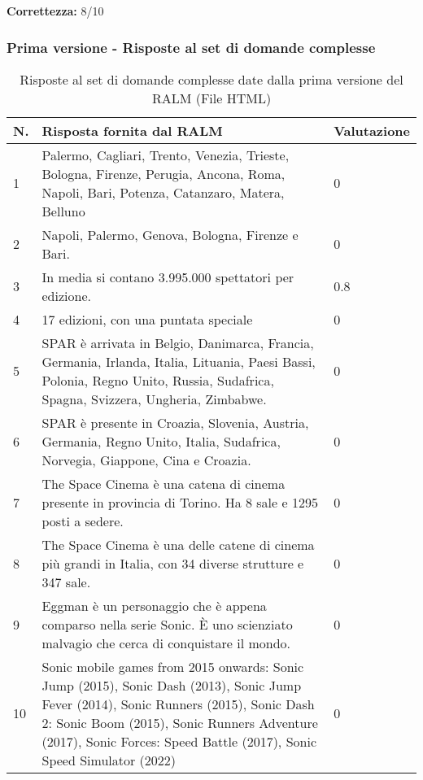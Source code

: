 \textbf{Correttezza:} 8/10

\subsubsection{Prima versione - Risposte al set di domande complesse}

\begin{table}[H]
    \centering
    \begin{tabular}{|p{0.5cm} |p{6cm} |p{2cm}|}
        \hline
        \textbf{N}. & \textbf{Risposta fornita dal RALM} & \textbf{Valutazione} \\
        \hline
        1 & Palermo, Cagliari, Trento, Venezia, Trieste, Bologna, Firenze, Perugia, Ancona, Roma, Napoli, Bari, Potenza, Catanzaro, Matera, Belluno & 0 \\
        \hline
        2 & Napoli, Palermo, Genova, Bologna, Firenze e Bari. & 0 \\
        \hline
        3 & In media si contano 3.995.000 spettatori per edizione. & 0.8 \\
        \hline
        4 & 17 edizioni, con una puntata speciale & 0 \\
        \hline
        5 & SPAR è arrivata in Belgio, Danimarca, Francia, Germania, Irlanda, Italia, Lituania, Paesi Bassi, Polonia, Regno Unito, Russia, Sudafrica, Spagna, Svizzera, Ungheria, Zimbabwe. & 0 \\
        \hline
        6 & SPAR è presente in Croazia, Slovenia, Austria, Germania, Regno Unito, Italia, Sudafrica, Norvegia, Giappone, Cina e Croazia. & 0 \\
        \hline
        7 & The Space Cinema è una catena di cinema presente in provincia di Torino. Ha 8 sale e 1295 posti a sedere. & 0 \\
        \hline
        8 & The Space Cinema è una delle catene di cinema più grandi in Italia, con 34 diverse strutture e 347 sale.  & 0 \\
        \hline
        9 & Eggman è un personaggio che è appena comparso nella serie Sonic. È uno scienziato malvagio che cerca di conquistare il mondo. & 0 \\
        \hline
        10 & Sonic mobile games from 2015 onwards: Sonic Jump (2015), Sonic Dash (2013), Sonic Jump Fever (2014), Sonic Runners (2015), Sonic Dash 2: Sonic Boom (2015), Sonic Runners Adventure (2017), Sonic Forces: Speed Battle (2017), Sonic Speed Simulator (2022) & 0 \\
        \hline
    \end{tabular}
    \caption{Risposte al set di domande complesse date dalla prima versione del RALM (File HTML)}
\end{table}

